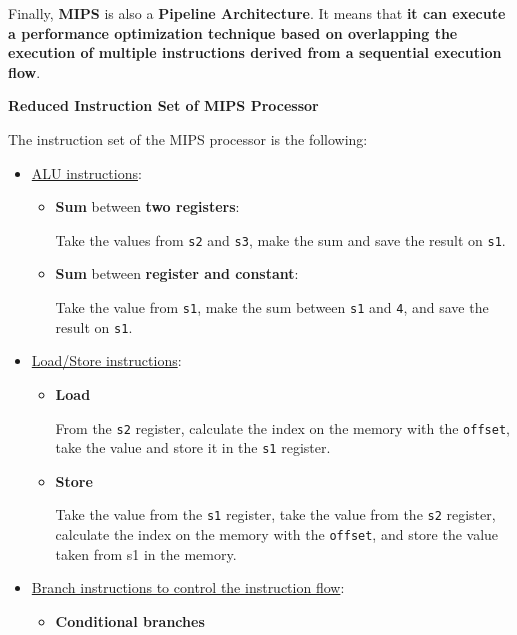 \highspace
Finally, \textbf{MIPS} is also a \textbf{Pipeline Architecture}. It means that \textbf{it can execute a performance optimization technique based on overlapping the execution of multiple instructions derived from a sequential execution flow}.

\newpage

\begin{center}
    \large
    \textcolor{Red3}{\textbf{Reduced Instruction Set of MIPS Processor}}
\end{center}
The instruction set of the MIPS processor is the following:
\begin{itemize}
    \item \underline{ALU instructions}:
    \begin{itemize}
        \item \textbf{Sum} between \textbf{two registers}:
        
        Take the values from \texttt{s2} and \texttt{s3}, make the sum and save the result on \texttt{s1}.

        \item \textbf{Sum} between \textbf{register and constant}:
        
        Take the value from \texttt{s1}, make the sum between \texttt{s1} and \texttt{4}, and save the result on \texttt{s1}.
    \end{itemize}

    \item \underline{Load/Store instructions}:
    \begin{itemize}
        \item \textbf{Load}
        
        From the \texttt{s2} register, calculate the index on the memory with the \texttt{offset}, take the value and store it in the \texttt{s1} register.

        \item \textbf{Store}
        
        Take the value from the \texttt{s1} register, take the value from the \texttt{s2} register, calculate the index on the memory with the \texttt{offset}, and store the value taken from s1 in the memory.
    \end{itemize}

    \item \underline{Branch instructions to control the instruction flow}:
    \begin{itemize}
        \item \textbf{Conditional branches}
        

\end{itemize}
\end{itemize}
